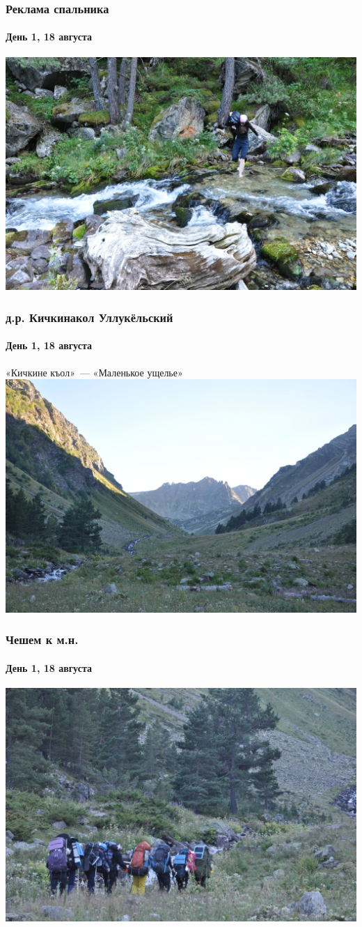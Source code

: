 \begin{frame}
	\frametitle{Реклама спальника}
	\framesubtitle{День 1, 18 августа}
	\centering
	\includegraphics[width=\linewidth]{../pics/DSC_0550}
\end{frame}

\begin{frame}
	\frametitle{д.р. Кичкинакол Уллукёльский}
	\framesubtitle{День 1, 18 августа}
	«Кичкине къол»~--- «Маленькое ущелье»
	\centering
	\includegraphics[width=\linewidth]{../pics/DSC_0558}
\end{frame}

\begin{frame}
	\frametitle{Чешем к м.н.}
	\framesubtitle{День 1, 18 августа}
	\centering
	\includegraphics[width=\linewidth]{../pics/DSC_0559}
\end{frame}


